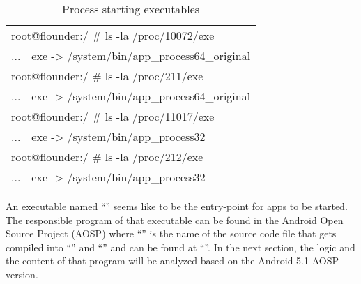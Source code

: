 \begin{table}[htb]
  \caption[Process starting executables]{Process starting executables}
  \label{tab:process_executables}
  \centering
  \begin{tabular}{l l}
    \toprule
    \multicolumn{2}{l}{root@flounder:/ \# ls -la /proc/10072/exe} \\
    ... & exe -> /system/bin/app\_process64\_original\\
    \midrule
    \multicolumn{2}{l}{root@flounder:/ \# ls -la /proc/211/exe} \\
    ... & exe -> /system/bin/app\_process64\_original\\
    \midrule
    \multicolumn{2}{l}{root@flounder:/ \# ls -la /proc/11017/exe} \\
    ... & exe -> /system/bin/app\_process32\\
    \midrule
    \multicolumn{2}{l}{root@flounder:/ \# ls -la /proc/212/exe} \\
    ... & exe -> /system/bin/app\_process32\\
    \bottomrule
  \end{tabular}
\end{table}

An executable named ``'' seems like to be the entry-point for apps to be started. The responsible program of that executable
can be found in the Android Open Source Project (AOSP) where
``'' is the name of the source code file that gets
compiled into ``'' and ``''
and can be found at ``''.
In the next section, the logic and the content of that program will be analyzed based on the Android 5.1 AOSP version.


